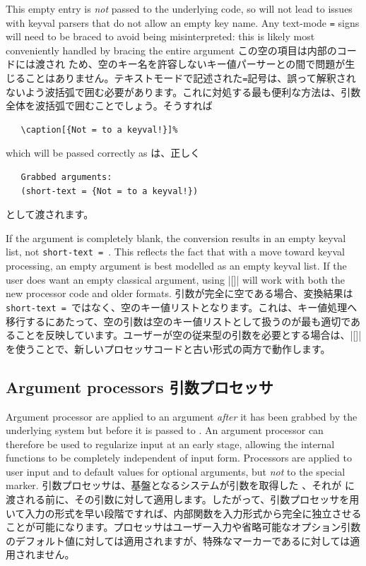 \documentclass{ltxguide}
\newcommand\jpnewline{\vspace{3pt}\newline}
\DeclareRobustCommand{\jpemph}[1]{%
  \underLine{#1}%
}
\begin{document}
This empty entry is \emph{not} passed to the underlying code, so will not lead
to issues with keyval parsers that do not allow an empty key name. Any text-mode
\texttt{=} signs will need to be braced to avoid being misinterpreted: this
is likely most conveniently handled by bracing the entire argument
\jpnewline
この空の項目は内部のコードには渡され\jpemph{ない}ため、空のキー名を許容しないキー値パーサーとの間で問題が生じることはありません。テキストモードで記述された\texttt{=}記号は、誤って解釈されないよう波括弧で囲む必要があります。これに対処する最も便利な方法は、引数全体を波括弧で囲むことでしょう。そうすれば
\begin{verbatim}
   \caption[{Not = to a keyval!}]%
\end{verbatim}
which will be passed correctly as
\jpnewline
は、正しく
\begin{verbatim}
   Grabbed arguments:
   (short-text = {Not = to a keyval!})
\end{verbatim}
として渡されます。

If the argument is completely blank, the conversion results in an empty keyval
list, not \verb*|short-text = |. This reflects the fact that with a move toward
keyval processing, an empty argument is best modelled as an empty keyval list.
If the user does want an empty classical argument, using |[{}]| will work
with both the new processor code and older formats.
\jpnewline
引数が完全に空である場合、変換結果は\verb*|short-text = |ではなく、空のキー値リストとなります。これは、キー値処理へ移行するにあたって、空の引数は空のキー値リストとして扱うのが最も適切であることを反映しています。ユーザーが空の従来型の引数を必要とする場合は、|[{}]|を使うことで、新しいプロセッサコードと古い形式の両方で動作します。


\subsection{Argument processors
引数プロセッサ}
\label{sec:cmd:processors}

Argument processor are applied to an argument \emph{after} it has been grabbed
by the underlying system but before it is passed to . An argument
processor can therefore be used to regularize input at an early stage, allowing
the internal functions to be completely independent of input form. Processors
are applied to user input and to default values for optional arguments, but
\emph{not} to the special  marker.
\jpnewline
引数プロセッサは、基盤となるシステムが引数を取得した\jpemph{後で}、それが に渡される前に、その引数に対して適用します。したがって、引数プロセッサを用いて入力の形式を早い段階ですれば、内部関数を入力形式から完全に独立させることが可能になります。プロセッサはユーザー入力や省略可能なオプション引数のデフォルト値に対しては適用されますが、特殊なマーカーであるに対しては適用されません。
\end{document}
